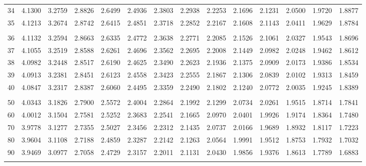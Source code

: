 {\begin{tabular}{l|lllllllllllll}
 34 & 4.1300 & 3.2759 & 2.8826 & 2.6499 & 2.4936 & 2.3803 & 2.2938 & 2.2253 & 2.1696 & 2.1231 & 2.0500 & 1.9720 & 1.8877 \\[5pt] \arrayrulecolor{light-gray}\hline\arrayrulecolor{black}  
 35 & 4.1213 & 3.2674 & 2.8742 & 2.6415 & 2.4851 & 2.3718 & 2.2852 & 2.2167 & 2.1608 & 2.1143 & 2.0411 & 1.9629 & 1.8784 \\[5pt] \arrayrulecolor{light-gray}\hline\arrayrulecolor{black}  
\\ 
 36 & 4.1132 & 3.2594 & 2.8663 & 2.6335 & 2.4772 & 2.3638 & 2.2771 & 2.2085 & 2.1526 & 2.1061 & 2.0327 & 1.9543 & 1.8696 \\[5pt] \arrayrulecolor{light-gray}\hline\arrayrulecolor{black}  
 37 & 4.1055 & 3.2519 & 2.8588 & 2.6261 & 2.4696 & 2.3562 & 2.2695 & 2.2008 & 2.1449 & 2.0982 & 2.0248 & 1.9462 & 1.8612 \\[5pt] \arrayrulecolor{light-gray}\hline\arrayrulecolor{black}  
 38 & 4.0982 & 3.2448 & 2.8517 & 2.6190 & 2.4625 & 2.3490 & 2.2623 & 2.1936 & 2.1375 & 2.0909 & 2.0173 & 1.9386 & 1.8534 \\[5pt] \arrayrulecolor{light-gray}\hline\arrayrulecolor{black}  
 39 & 4.0913 & 3.2381 & 2.8451 & 2.6123 & 2.4558 & 2.3423 & 2.2555 & 2.1867 & 2.1306 & 2.0839 & 2.0102 & 1.9313 & 1.8459 \\[5pt] \arrayrulecolor{light-gray}\hline\arrayrulecolor{black}  
 40 & 4.0847 & 3.2317 & 2.8387 & 2.6060 & 2.4495 & 2.3359 & 2.2490 & 2.1802 & 2.1240 & 2.0772 & 2.0035 & 1.9245 & 1.8389 \\[5pt] \arrayrulecolor{light-gray}\hline\arrayrulecolor{black}  
\\ 
 50 & 4.0343 & 3.1826 & 2.7900 & 2.5572 & 2.4004 & 2.2864 & 2.1992 & 2.1299 & 2.0734 & 2.0261 & 1.9515 & 1.8714 & 1.7841 \\[5pt] \arrayrulecolor{light-gray}\hline\arrayrulecolor{black}  
 60 & 4.0012 & 3.1504 & 2.7581 & 2.5252 & 2.3683 & 2.2541 & 2.1665 & 2.0970 & 2.0401 & 1.9926 & 1.9174 & 1.8364 & 1.7480 \\[5pt] \arrayrulecolor{light-gray}\hline\arrayrulecolor{black}  
 70 & 3.9778 & 3.1277 & 2.7355 & 2.5027 & 2.3456 & 2.2312 & 2.1435 & 2.0737 & 2.0166 & 1.9689 & 1.8932 & 1.8117 & 1.7223 \\[5pt] \arrayrulecolor{light-gray}\hline\arrayrulecolor{black}  
 80 & 3.9604 & 3.1108 & 2.7188 & 2.4859 & 2.3287 & 2.2142 & 2.1263 & 2.0564 & 1.9991 & 1.9512 & 1.8753 & 1.7932 & 1.7032 \\[5pt] \arrayrulecolor{light-gray}\hline\arrayrulecolor{black}  
 90 & 3.9469 & 3.0977 & 2.7058 & 2.4729 & 2.3157 & 2.2011 & 2.1131 & 2.0430 & 1.9856 & 1.9376 & 1.8613 & 1.7789 & 1.6883 \\[5pt] \arrayrulecolor{light-gray}\hline\arrayrulecolor{black}  

\end{tabular}}
